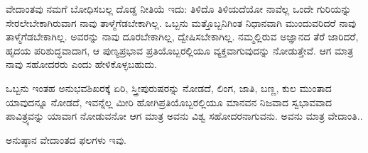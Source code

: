 \vskip 5pt

ವೇದಾಂತವು ನಮಗೆ ಬೋಧಿಸಬಲ್ಲ ದೊಡ್ಡ ನೀತಿಯೆ ಇದು: ತಿಳಿದೊ ತಿಳಿಯದೆಯೋ ನಾವೆಲ್ಲ ಒಂದೇ ಗುರಿಯನ್ನು ಸೇರಲೇಬೇಕಾಗಿರುವಾಗ ನಾವು ತಾಳ್ಮೆಗೆಡಬೇಕಾಗಿಲ್ಲ. ಒಬ್ಬನು ಮತ್ತೊಬ್ಬನಿಗಿಂತ ನಿಧಾನವಾಗಿ ಮುಂದುವರಿದರೆ ನಾವು ತಾಳ್ಮೆಗೆಡಬೇಕಾಗಿಲ್ಲ. ಅವರನ್ನು ನಾವು ದೂರಬೇಕಾಗಿಲ್ಲ, ದ್ವೇಷಿಸಬೇಕಾಗಿಲ್ಲ. ನಮ್ಮಲ್ಲಿರುವ ಅಜ್ಞಾನದ ತೆರೆ ಜಾರಿದರೆ, ಹೃದಯ ಪರಿಶುದ್ಧವಾದಾಗ, ಆ ಪುಣ್ಯಪ್ರಭಾವ ಪ್ರತಿಯೊಬ್ಬರಲ್ಲಿಯೂ ವ್ಯಕ್ತವಾಗುವುದನ್ನು ನೋಡುತ್ತೇವೆ. ಆಗ ಮಾತ್ರ ನಾವು ಸಹೋದರರು ಎಂದು ಹೇಳಿಕೊಳ್ಳಬಹುದು.

\vskip 5pt

ಒಬ್ಬನು ಇಂತಹ ಅನುಭವಶಿಖರಕ್ಕೆ ಏರಿ, ಸ್ತ್ರೀಪುರುಷರನ್ನು ನೋಡದೆ, ಲಿಂಗ, ಜಾತಿ, ಬಣ್ಣ, ಕುಲ ಮುಂತಾದ ಯಾವುದನ್ನೂ ನೋಡದೆ, ಇವನ್ನೆಲ್ಲ ಮೀರಿ ಹೋಗಿ\break ಪ್ರತಿಯೊಬ್ಬರಲ್ಲಿಯೂ ಮಾನವನ ನಿಜವಾದ ಸ್ವಭಾವವಾದ ಪಾವಿತ್ರ್ಯವನ್ನು ಯಾವಾಗ ನೋಡುವನೋ ಆಗ ಮಾತ್ರ ಅವನು ವಿಶ್ವ ಸಹೋದರನಾಗುವನು. ಅವನು ಮಾತ್ರ ವೇದಾಂತಿ..

\vskip 4pt

ಅನುಷ್ಠಾನ ವೇದಾಂತದ ಫಲಗಳು ಇವು.


